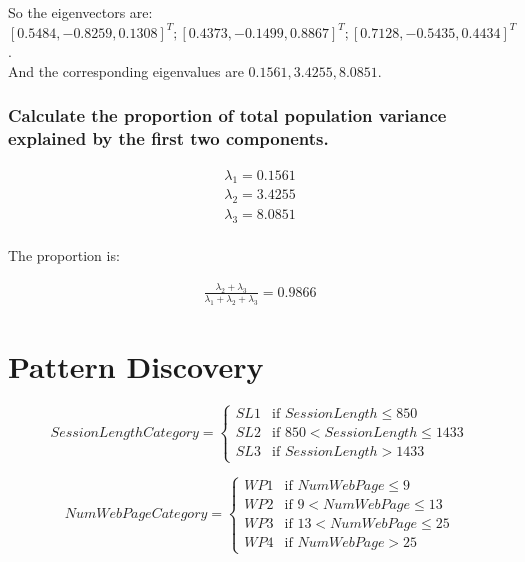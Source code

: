 \documentclass[paper=a4, fontsize=11pt]{scrartcl} %
\numberwithin{equation}{section} %
\numberwithin{figure}{section} %
\numberwithin{table}{section} %
\begin{document}
So the eigenvectors are: $[0.5484, -0.8259, 0.1308]^T; [0.4373, -0.1499, 0.8867]^T; [0.7128, -0.5435, 0.4434]^T$.\\

And the corresponding eigenvalues are $0.1561, 3.4255, 8.0851$.

\subsubsection{Calculate the proportion of total population variance explained by the first two components.}

\begin{align*}
    \lambda_1 = 0.1561\\
    \lambda_2 = 3.4255\\
    \lambda_3 = 8.0851\\
\end{align*}


The proportion is: 

\begin{align*}
    \frac{\lambda_2 + \lambda_3}{\lambda_1 + \lambda_2 + \lambda_3}=0.9866
\end{align*}

\section{Pattern Discovery}


\begin{equation*}
    SessionLengthCategory =
    \begin{cases}
      SL1 & \text{if $SessionLength \le 850$}\\
      SL2 & \text{if $850 < SessionLength\le 1433$}\\
      SL3 & \text{if $SessionLength > 1433$}
    \end{cases}
\end{equation*}

\begin{equation*}
    NumWebPageCategory =
    \begin{cases}
      WP1 & \text{if $NumWebPage \le 9$}\\
      WP2 & \text{if $9 < NumWebPage\le 13$}\\
      WP3 & \text{if $13 < NumWebPage\le 25$}\\
      WP4 & \text{if $NumWebPage > 25$}
    \end{cases}
\end{equation*}
\end{document}
